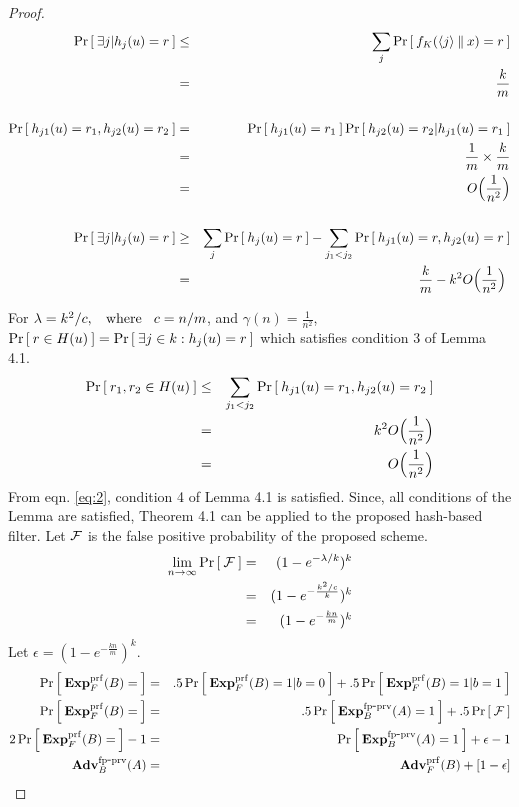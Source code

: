 \begin{proof}
\begin{eqnarray}
\nonumber\Pr\left[\: \exists j | h_j(u)=r \:\right] & \leq & \sum_{j}\Pr\left[\: f_K(\langle j \rangle \: \| \: x)=r \:\right]\\
& = & \frac{k}{m}\\\nonumber & &\\
\nonumber\Pr\left[\: h_{j1}(u) = r_1, h_{j2}(u) = r_2 \:\right] & = & \Pr\left[\: h_{j1}(u) = r_1 \:\right]\Pr\left[\: h_{j2}(u) = r_2 | h_{j1}(u) = r_1 \:\right]\\
\nonumber& = & \frac{1}{m} \times \frac{k}{m}\\
&=&	 O\Big(\frac{1}{n^2}\Big)\\\nonumber & &\\
\nonumber \Pr\left[\: \exists j | h_j(u)=r  \:\right] & \geq & \sum_{j} \Pr\left[\: h_j(u)=r \:\right] - \sum_{j_1 < j_2}\Pr\left[\: h_{j1}(u) = r, h_{j2}(u) = r \:\right]\\
& = & \frac{k}{m} - k^2O\Big(\frac{1}{n^2}\Big)\label{eq:1}\
\end{eqnarray}

For $\lambda = k^2/c, \hspace*{2ex} \mathrm{where} \hspace*{2ex} c=n/m$,  and $\gamma(n)=\frac{1}{n^2}$, $\Pr\left[\: r\in H(u) \:\right] = \Pr\left[\: \exists j \in {k}: h_j(u)=r  \:\right]$ which satisfies condition 3 of Lemma 4.1. 
\begin{eqnarray}
\nonumber\Pr\left[\: r_1, r_2 \in H(u) \:\right] & \leq & \sum_{j_1 < j_2}\Pr\left[\: h_{j1}(u) = r_1, h_{j2}(u) = r_2 \:\right] \\
\nonumber& = & k^2O\Big(\frac{1}{n^2}\Big)\\
& = & O\Big(\frac{1}{n^2}\Big)\label{eq:2}
\end{eqnarray}
From eqn. \ref{eq:2}, condition 4 of Lemma 4.1 is satisfied. Since, all conditions of the Lemma are satisfied, Theorem 4.1 can be applied to the proposed hash-based filter. Let ${\cal F}$ is the false positive probability of the proposed scheme.
\begin{eqnarray}
\nonumber\lim_{n \rightarrow \infty}\Pr\left[\: {\cal F} \:\right] & = & (1-e^{-\lambda/k})^k \\
\nonumber& = & (1-e^{-\frac{k^2/c}{k}})^k\\
& = & (1-e^{-\frac{kn}{m}})^k
\end{eqnarray}
Let $\epsilon = (1-e^{-\frac{kn}{m}})^k$.
\begin{eqnarray}
\nonumber\Pr\left[\: \mathbf{Exp}^{\mathrm{prf}}_{F}(B)= \:\right] & = & .5\Pr\left[\: \mathbf{Exp}^{\mathrm{prf}}_{F}(B)=1|b=0 \:\right] + .5\Pr\left[\: \mathbf{Exp}^{\mathrm{prf}}_{F}(B)=1|b=1 \:\right]\\
\nonumber\Pr\left[\: \mathbf{Exp}^{\mathrm{prf}}_{F}(B)= \:\right] & = & .5\Pr\left[\: \mathrm{\mathbf{Exp}}^{\mathrm{fp\mbox{-}prv}}_{B}(A)=1 \:\right] + .5\Pr\left[\: {\cal F} \:\right]\\
\nonumber 2\Pr\left[\: \mathbf{Exp}^{\mathrm{prf}}_{F}(B)= \:\right]-1 & = & \Pr\left[\: \mathrm{\mathbf{Exp}}^{\mathrm{fp\mbox{-}prv}}_{B}(A)=1 \:\right] + \epsilon - 1\\
\mathrm{\mathbf{Adv}}^{\mathrm{fp\mbox{-}prv}}_{B}(A) & = & \mathbf{Adv}^{\mathrm{prf}}_{F}(B) + [1-\epsilon]
\end{eqnarray}
\end{proof}

